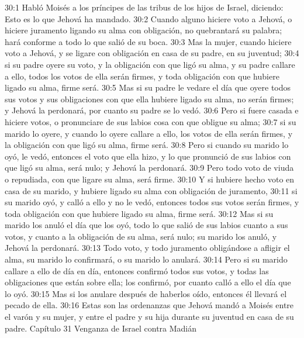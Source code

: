 30:1 Habló Moisés a los príncipes de las tribus de los hijos de Israel, diciendo: Esto es lo que Jehová ha mandado.  
30:2 Cuando alguno hiciere voto a Jehová, o hiciere juramento ligando su alma con obligación, no quebrantará su palabra; hará conforme a todo lo que salió de su boca.  
30:3 Mas la mujer, cuando hiciere voto a Jehová, y se ligare con obligación en casa de su padre, en su juventud;  
30:4 si su padre oyere su voto, y la obligación con que ligó su alma, y su padre callare a ello, todos los votos de ella serán firmes, y toda obligación con que hubiere ligado su alma, firme será.  
30:5 Mas si su padre le vedare el día que oyere todos sus votos y sus obligaciones con que ella hubiere ligado su alma, no serán firmes; y Jehová la perdonará, por cuanto su padre se lo vedó.  
30:6 Pero si fuere casada e hiciere votos, o pronunciare de sus labios cosa con que obligue su alma;  
30:7 si su marido lo oyere, y cuando lo oyere callare a ello, los votos de ella serán firmes, y la obligación con que ligó su alma, firme será.  
30:8 Pero si cuando su marido lo oyó, le vedó, entonces el voto que ella hizo, y lo que pronunció de sus labios con que ligó su alma, será nulo; y Jehová la perdonará.  
30:9 Pero todo voto de viuda o repudiada, con que ligare su alma, será firme.  
30:10 Y si hubiere hecho voto en casa de su marido, y hubiere ligado su alma con obligación de juramento,  
30:11 si su marido oyó, y calló a ello y no le vedó, entonces todos sus votos serán firmes, y toda obligación con que hubiere ligado su alma, firme será.  
30:12 Mas si su marido los anuló el día que los oyó, todo lo que salió de sus labios cuanto a sus votos, y cuanto a la obligación de su alma, será nulo; su marido los anuló, y Jehová la perdonará.  
30:13 Todo voto, y todo juramento obligándose a afligir el alma, su marido lo confirmará, o su marido lo anulará.  
30:14 Pero si su marido callare a ello de día en día, entonces confirmó todos sus votos, y todas las obligaciones que están sobre ella; los confirmó, por cuanto calló a ello el día que lo oyó.  
30:15 Mas si los anulare después de haberlos oído, entonces él llevará el pecado de ella.  
30:16 Estas son las ordenanzas que Jehová mandó a Moisés entre el varón y su mujer, y entre el padre y su hija durante su juventud en casa de su padre.  
Capítulo 31 
Venganza de Israel contra Madián  

